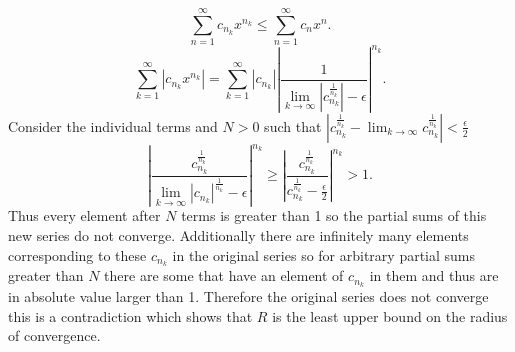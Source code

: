 \documentclass{amsart}
\begin{document}
        \[
            \sum_{n=1}^{\infty}c_{n_k}x^{n_k} \le \sum_{n=1}^{\infty}c_nx^{n}
        .\] 
        \[
            \sum_{k=1}^{\infty}|c_{n_k}x^{n_k}| = \sum_{k=1}^{\infty}|c_{n_k}||\frac{1}{\lim_{k\to \infty}|c_{n_k}^{\frac{1}{n_k}}|-\epsilon}|^{n_k}
        .\] 
        Consider the individual terms and $N > 0$ such that $|c_{n_k}^{\frac{1}{n_k}} - \lim_{k\to \infty}c_{n_k}^{\frac{1}{n_k}}| < \frac{\epsilon}{2}$
         \[
             |\frac{c_{n_k}^{\frac{1}{n_k}}}{\lim_{k\to \infty}|c_{n_k}|^{\frac{1}{n_k}}-\epsilon}|^{n_k} \ge |\frac{c_{n_k}^{\frac{1}{n_k}}}{c_{n_k}^{\frac{1}{n_k}}-\frac{\epsilon}{2}}|^{n_k} > 1
         .\] 
         Thus every element after $N$ terms is greater than 1 so the partial sums of this new series do not converge.
         Additionally there are infinitely many elements corresponding to these $c_{n_k}$ in the original series
         so for arbitrary partial sums greater than $N$ there are some that have an element of  $c_{n_k}$ in them and thus are in absolute value
         larger than 1. Therefore the original series does not converge this is a contradiction which shows that $R$ is the least upper bound on the radius of convergence. 
\end{document}
